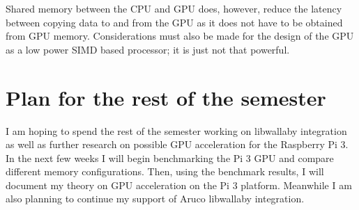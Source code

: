 \documentclass[twoside]{report}
\begin{document}
  Shared memory between the CPU and GPU does, however, reduce the latency between
  copying data to and from the GPU as it does not have to be obtained from GPU
  memory. Considerations must also be made for the design of the GPU as a low
  power SIMD based processor; it is just not that powerful.
  \section{Plan for the rest of the semester}
  I am hoping to spend the rest of the semester working on libwallaby integration
  as well as further research on possible GPU acceleration for the Raspberry Pi 3.
  In the next few weeks I will begin benchmarking the Pi 3 GPU and compare different
  memory configurations.  Then, using the benchmark results, I will document my
  theory on GPU acceleration on the Pi 3 platform.  Meanwhile I am also planning
  to continue my support of Aruco libwallaby integration. 
\end{document}
